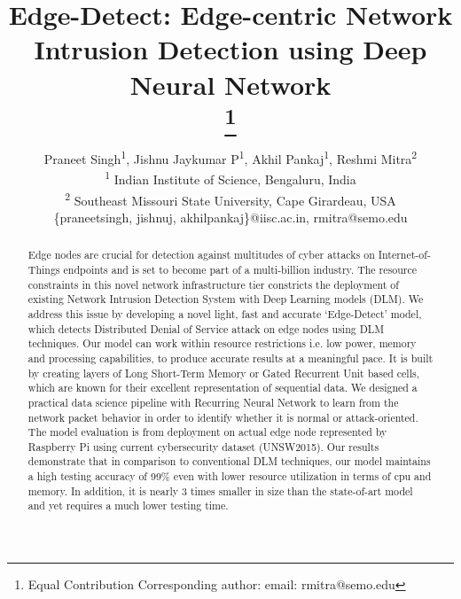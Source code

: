 \documentclass[conference]{IEEEtran}
\begin{document}
\title{Edge-Detect: Edge-centric Network Intrusion Detection using Deep Neural Network\\
\thanks{ Equal Contribution \newline\indent Corresponding author: email: rmitra@semo.edu
}
}

\author{
Praneet Singh\textsuperscript{1},
Jishnu Jaykumar P\textsuperscript{1},
Akhil Pankaj\textsuperscript{1}, 
Reshmi Mitra\textsuperscript{2} \\
\textsuperscript{1} Indian Institute of Science, Bengaluru, India \\
\textsuperscript{2} Southeast Missouri State University, Cape Girardeau, USA \\
\small{\{praneetsingh, jishnuj, akhilpankaj\}@iisc.ac.in, rmitra@semo.edu}
}



\maketitle

\begin{abstract}
Edge nodes are crucial for detection against multitudes of cyber attacks on Internet-of-Things endpoints and is set to become part of a multi-billion industry. The resource constraints in this novel network infrastructure tier constricts the deployment of existing Network Intrusion Detection System with Deep Learning models (DLM).
We address this issue by developing a novel light, fast and accurate `Edge-Detect' model, which detects Distributed Denial of Service attack on edge nodes using DLM techniques. 
Our model can work within resource restrictions i.e. low power, memory and processing capabilities, to produce accurate results at a meaningful pace.
It is built by creating layers of Long Short-Term Memory or Gated Recurrent Unit based cells, which are known for their excellent representation of sequential data.
We designed a practical data science pipeline with Recurring Neural Network to learn from the network packet behavior in order to identify whether it is normal or attack-oriented. The model evaluation is from deployment on actual edge node represented by Raspberry Pi using current cybersecurity dataset (UNSW2015). Our results demonstrate that in comparison to conventional DLM techniques, our model maintains a high testing accuracy of 99\% even with lower resource utilization in terms of cpu and memory. In addition, it is nearly 3 times smaller in size than the state-of-art model and yet requires a much lower testing time.
\end{abstract}
\end{document}
